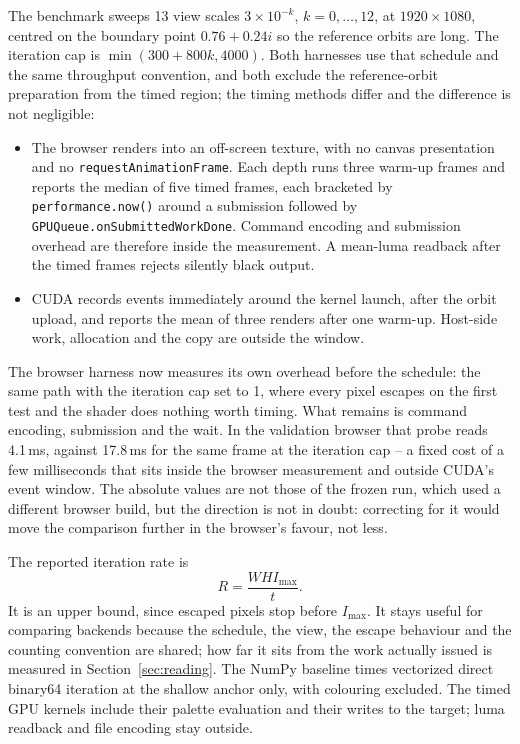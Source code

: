 \documentclass[10pt,a4paper]{article}
\begin{document}
The benchmark sweeps 13 view scales \(3\times10^{-k}\), \(k=0,\ldots,12\), at
\(1920\times1080\), centred on the boundary point \(0.76+0.24i\) so the
reference orbits are long. The iteration cap is \(\min(300+800k,4000)\).
Both harnesses use that schedule and the same throughput convention, and both
exclude the reference-orbit preparation from the timed region; the timing
methods differ and the difference is not negligible:

\begin{itemize}
  \item The browser renders into an off-screen texture, with no canvas
        presentation and no \texttt{requestAnimationFrame}. Each depth runs
        three warm-up frames and reports the median of five timed frames, each
        bracketed by \texttt{performance.now()} around a submission followed by
        \texttt{GPUQueue.onSubmittedWorkDone}. Command encoding and submission
        overhead are therefore inside the measurement. A mean-luma readback
        after the timed frames rejects silently black output.
  \item CUDA records events immediately around the kernel launch, after the
        orbit upload, and reports the mean of three renders after one warm-up.
        Host-side work, allocation and the copy are outside the window.
\end{itemize}

The browser harness now measures its own overhead before the schedule: the same
path with the iteration cap set to 1, where every pixel escapes on the first
test and the shader does nothing worth timing. What remains is command
encoding, submission and the wait. In the validation browser that probe reads
4.1\,ms, against 17.8\,ms for the same frame at the iteration cap -- a fixed
cost of a few milliseconds that sits inside the browser measurement and outside
CUDA's event window. The absolute values are not those of the frozen
run, which used a different browser build, but the direction is not in doubt:
correcting for it would move the comparison further in the browser's favour,
not less.

The reported iteration rate is
\begin{equation}
  R = \frac{W H I_{\max}}{t}.
  \label{eq:giter}
\end{equation}
It is an upper bound, since escaped pixels stop before \(I_{\max}\). It stays
useful for comparing backends because the schedule, the view, the escape
behaviour and the counting convention are shared; how far it sits from the
work actually issued is measured in Section~\ref{sec:reading}. The NumPy baseline
\cite{numpy2020} times vectorized direct binary64 iteration at the shallow
anchor only, with colouring excluded. The timed GPU kernels include their
palette evaluation and their writes to the target; luma readback and file
encoding stay outside.
\end{document}
